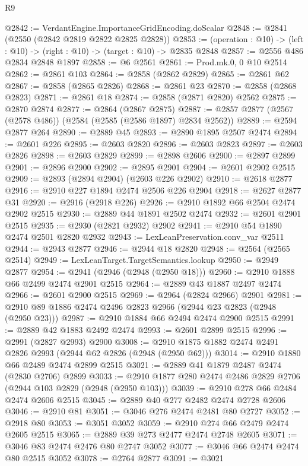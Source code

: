 \begin{lexlean}{R9}
\begin{coremodule}
@2842 := VerdantEngine.ImportanceGridEncoding.doScalar
@2848 := @2841 (@2550 (@2842 @2819 @2822 @2825 @2828))
@2853 := (operation : @10) -> (left : @10) -> (right : @10) -> (target : @10) -> @2835 @2848
@2857 := @2556 @486 @2834 @2848 @1897
@2858 := @6 @2561
@2861 := Prod.mk.{0, 0} @10 @2514
@2862 := @2861 @103
@2864 := @2858 (@2862 @2829)
@2865 := @2861 @62
@2867 := @2858 (@2865 @2826)
@2868 := @2861 @23
@2870 := @2858 (@2868 @2823)
@2871 := @2861 @18
@2874 := @2858 (@2871 @2820) @2562
@2875 := @2870 @2874
@2877 := @2864 (@2867 @2875)
@2887 := @2857 @2877 (@2567 (@2578 @486)) (@2584 (@2585 (@2586 @1897) @2834 @2562))
@2889 := @2594 @2877 @264
@2890 := @2889 @45
@2893 := @2890 @1895 @2507 @2474
@2894 := @2601 @226
@2895 := @2603 @2820
@2896 := @2603 @2823
@2897 := @2603 @2826
@2898 := @2603 @2829
@2899 := @2898 @2606
@2900 := @2897 @2899
@2901 := @2896 @2900
@2902 := @2895 @2901
@2904 := @2601 @2902 @2515
@2909 := @2893 (@2894 @2904) (@2603 @226 @2902)
@2910 := @2618 @2877
@2916 := @2910 @227 @1894 @2474 @2506 @226 @2904
@2918 := @2627 @2877 @31
@2920 := @2916 (@2918 @226)
@2926 := @2910 @1892 @66 @2504 @2474 @2902 @2515
@2930 := @2889 @44 @1891 @2502 @2474
@2932 := @2601 @2901 @2515
@2935 := @2930 (@2821 @2932) @2902
@2941 := @2910 @54 @1890 @2474 @2501 @2820 @2932
@2943 := LexLeanPreservation.conv_var @2511
@2944 := @2943 @2877
@2946 := @2944 @18 @2820
@2948 := @2564 (@2565 @2514)
@2949 := LexLeanTarget.TargetSemantics.lookup
@2950 := @2949 @2877
@2954 := @2941 (@2946 (@2948 (@2950 @18)))
@2960 := @2910 @1888 @66 @2499 @2474 @2901 @2515
@2964 := @2889 @43 @1887 @2497 @2474
@2966 := @2601 @2900 @2515
@2969 := @2964 (@2824 @2966) @2901
@2981 := @2910 @89 @1886 @2474 @2496 @2823 @2966 (@2944 @23 @2823 (@2948 (@2950 @23)))
@2987 := @2910 @1884 @66 @2494 @2474 @2900 @2515
@2991 := @2889 @42 @1883 @2492 @2474
@2993 := @2601 @2899 @2515
@2996 := @2991 (@2827 @2993) @2900
@3008 := @2910 @1875 @1882 @2474 @2491 @2826 @2993 (@2944 @62 @2826 (@2948 (@2950 @62)))
@3014 := @2910 @1880 @66 @2489 @2474 @2899 @2515
@3021 := @2889 @41 @1879 @2487 @2474 (@2830 @2706) @2899
@3033 := @2910 @1877 @280 @2474 @2486 @2829 @2706 (@2944 @103 @2829 (@2948 (@2950 @103)))
@3039 := @2910 @278 @66 @2484 @2474 @2606 @2515
@3045 := @2889 @40 @277 @2482 @2474 @2728 @2606
@3046 := @2910 @81
@3051 := @3046 @276 @2474 @2481 @80 @2727
@3052 := @2918 @80
@3053 := @3051 @3052
@3059 := @2910 @274 @66 @2479 @2474 @2605 @2515
@3065 := @2889 @39 @273 @2477 @2474 @2748 @2605
@3071 := @3046 @83 @2474 @2476 @80 @2747 @3052
@3077 := @3046 @66 @2474 @2474 @80 @2515 @3052
@3078 := @2764 @2877
@3091 := @3021

\end{coremodule}
\end{lexlean}

